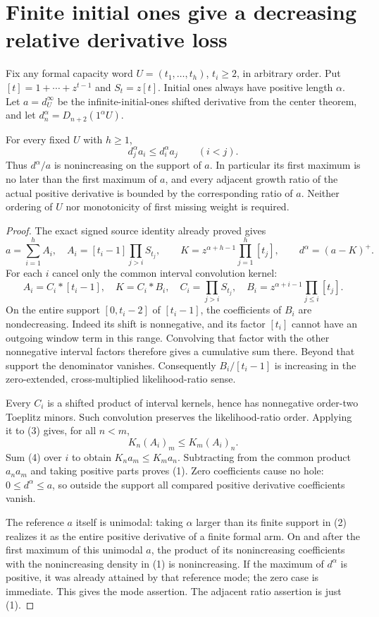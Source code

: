 \section{Finite initial ones give a decreasing relative derivative loss}
Fix any formal capacity word $U=(t_1,\ldots,t_h)$, $t_i\ge2$,
in arbitrary order. Put $[t]=1+\cdots+z^{t-1}$ and
$S_t=z[t]$. Initial ones always have positive length $\alpha$.
Let $a=d^\infty_U$ be the infinite-initial-ones shifted derivative
from the center theorem, and let $d^\alpha_n=D_{n+2}(1^\alpha U)$.

\begin{theorem}
For every fixed $U$ with $h\ge1$,
\[
             d^\alpha_j a_i\le d^\alpha_i a_j\qquad(i<j).
                                                               \tag{1}
\]
Thus $d^\alpha/a$ is nonincreasing on the support of $a$.
In particular its first maximum is no later than the first
maximum of $a$, and every adjacent growth ratio of the actual
positive derivative is bounded by the corresponding ratio of $a$.
Neither ordering of $U$ nor monotonicity of first missing weight
is required.
\end{theorem}
\begin{proof}
The exact signed source identity already proved gives
\[
 a=\sum_{i=1}^h A_i,\quad
 A_i=[t_i-1]\prod_{j>i}S_{t_j},\qquad
 K=z^{\alpha+h-1}\prod_{j=1}^h[t_j],\qquad
 d^\alpha=(a-K)^+ .                                           \tag{2}
\]
For each $i$ cancel only the common interval convolution kernel:
\[
 A_i=C_i*[t_i-1],\quad
 K=C_i*B_i,\quad
 C_i=\prod_{j>i}S_{t_j},\quad
 B_i=z^{\alpha+i-1}\prod_{j\le i}[t_j].                        \tag{3}
\]
On the entire support $[0,t_i-2]$ of $[t_i-1]$, the
coefficients of $B_i$ are nondecreasing. Indeed its shift is
nonnegative, and its factor $[t_i]$ cannot have an outgoing
window term in this range. Convolving that factor with the
other nonnegative interval factors therefore gives a cumulative
sum there. Beyond that support the denominator vanishes.
Consequently $B_i/[t_i-1]$ is increasing in the zero-extended,
cross-multiplied likelihood-ratio sense.

Every $C_i$ is a shifted product of interval kernels, hence
has nonnegative order-two Toeplitz minors. Such convolution
preserves the likelihood-ratio order. Applying it to (3)
gives, for all $n<m$,
\[
                         K_n(A_i)_m\le K_m(A_i)_n .            \tag{4}
\]
Sum (4) over $i$ to obtain $K_n a_m\le K_m a_n$.
Subtracting from the common product $a_na_m$ and taking
positive parts proves (1). Zero coefficients cause no hole:
$0\le d^\alpha\le a$, so outside the support all compared
positive derivative coefficients vanish.

The reference $a$ itself is unimodal: taking $\alpha$ larger
than its finite support in (2) realizes it as the entire
positive derivative of a finite formal arm. On and after
the first maximum of this unimodal $a$, the
product of its nonincreasing coefficients with the
nonincreasing density in (1) is nonincreasing. If the maximum
of $d^\alpha$ is positive, it was already attained by that
reference mode; the zero case is immediate. This gives the
mode assertion. The adjacent ratio assertion is just (1).
\end{proof}

